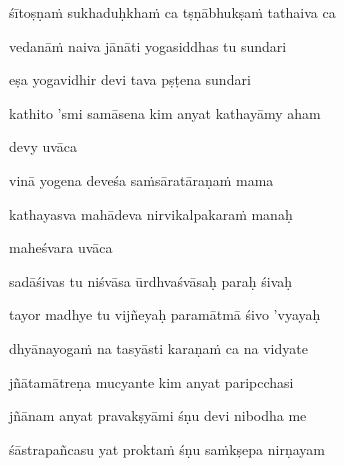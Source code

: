 śītoṣṇa\.m sukhaduḥkha\.m ca tṣṇābhukṣa\.m tathaiva ca\thinspace{\dandab} \dontdisplaylinenum

vedanā\.m naiva jānāti yogasiddhas tu sundari \veg\dontdisplaylinenum

eṣa yogavidhir devi tava pṣṭena sundari\thinspace{\dandab} \dontdisplaylinenum

kathito 'smi samāsena kim anyat kathayāmy aham \veg\dontdisplaylinenum

devy uvāca~{\dandab}\dontdisplaylinenum 

vinā yogena deveśa sa\.msāratāraṇa\.m mama\thinspace{\danda} \dontdisplaylinenum

kathayasva mahādeva nirvikalpakara\.m manaḥ \veg\dontdisplaylinenum

maheśvara uvāca~{\dandab}\dontdisplaylinenum 

sadāśivas tu niśvāsa ūrdhvaśvāsaḥ paraḥ śivaḥ\thinspace{\danda} \dontdisplaylinenum

tayor madhye tu vijñeyaḥ paramātmā śivo 'vyayaḥ \veg\dontdisplaylinenum

dhyānayoga\.m na tasyāsti karaṇa\.m ca na vidyate\thinspace{\dandab} \dontdisplaylinenum

jñātamātreṇa mucyante kim anyat paripcchasi \veg\dontdisplaylinenum


jñānam anyat pravakṣyāmi śṇu devi nibodha me\thinspace{\dandab} \dontdisplaylinenum

śāstrapañcasu yat prokta\.m śṇu sa\.mkṣepa nirṇayam \danda\dontdisplaylinenum

